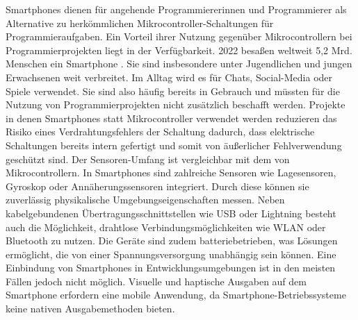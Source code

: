 \documentclass[11pt,a4paper]{report}
\begin{document}
Smartphones dienen für angehende Programmiererinnen und Programmierer als Alternative zu herkömmlichen Mikrocontroller-Schaltungen für Programmieraufgaben.
Ein Vorteil ihrer Nutzung gegenüber Mikrocontrollern bei Programmierprojekten liegt in der Verfügbarkeit.
2022 besaßen weltweit 5,2 Mrd. Menschen ein Smartphone \cite{smartphone_users}.
Sie sind insbesondere unter Jugendlichen und jungen Erwachsenen weit verbreitet.
Im Alltag wird es für Chats, Social-Media oder Spiele verwendet.
Sie sind also häufig bereits in Gebrauch und müssten für die Nutzung von Programmierprojekten nicht zusätzlich beschafft werden.
Projekte in denen Smartphones statt Mikrocontroller verwendet werden reduzieren das Risiko eines Verdrahtungsfehlers der Schaltung dadurch, dass elektrische Schaltungen bereits intern gefertigt und somit von äußerlicher Fehlverwendung geschützt sind.
Der Sensoren-Umfang ist vergleichbar mit dem von Mikrocontrollern.
In Smartphones sind zahlreiche Sensoren wie Lagesensoren, Gyroskop oder Annäherungssensoren integriert.
Durch diese können sie zuverlässig physikalische Umgebungseigenschaften messen.
Neben kabelgebundenen Übertragungsschnittstellen wie USB oder Lightning besteht auch die Möglichkeit, drahtlose Verbindungsmöglichkeiten wie WLAN oder Bluetooth zu nutzen.
Die Geräte sind zudem batteriebetrieben, was Lösungen ermöglicht, die von einer Spannungsversorgung unabhängig sein können. 
Eine Einbindung von Smartphones in Entwicklungsumgebungen ist in den meisten Fällen jedoch nicht möglich.
Visuelle und haptische Ausgaben auf dem Smartphone erfordern eine mobile Anwendung, da Smartphone-Betriebssysteme keine nativen Ausgabemethoden bieten.
\end{document}
